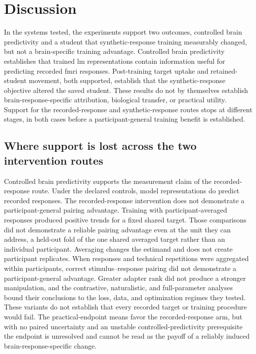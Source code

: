 \section{Discussion}
\label{sec:discussion}

In the systems tested, the experiments support two outcomes, controlled brain predictivity and a student that synthetic-response training measurably changed, but not a brain-specific training advantage.
Controlled brain predictivity establishes that trained \ac{lm} representations contain information useful for predicting recorded \ac{fmri} responses.
Post-training target uptake and retained-student movement, both supported, establish that the synthetic-response objective altered the saved student.
These results do not by themselves establish brain-response-specific attribution, biological transfer, or practical utility.
Support for the recorded-response and synthetic-response routes stops at different stages, in both cases before a participant-general training benefit is established.

\subsection{Where support is lost across the two intervention routes}
\label{sec:discussion-failure}

Controlled brain predictivity supports the measurement claim of the recorded-response route.
Under the declared controls, model representations do predict recorded responses.
The recorded-response intervention does not demonstrate a participant-general pairing advantage.
Training with participant-averaged responses produced positive trends for a fixed shared target.
Those comparisons did not demonstrate a reliable pairing advantage even at the unit they can address, a held-out fold of the one shared averaged target rather than an individual participant.
Averaging changes the estimand and does not create participant replicates.
When responses and technical repetitions were aggregated within participants, correct stimulus--response pairing did not demonstrate a participant-general advantage.
Greater adapter rank did not produce a stronger manipulation, and the contrastive, naturalistic, and full-parameter analyses bound their conclusions to the loss, data, and optimization regimes they tested.
These variants do not establish that every recorded target or training procedure would fail.
The practical-endpoint means favor the recorded-response arm, but with no paired uncertainty and an unstable controlled-predictivity prerequisite the endpoint is unresolved and cannot be read as the payoff of a reliably induced brain-response-specific change.

